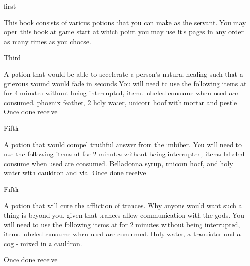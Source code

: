 \documentclass[greennotebook]{guildcamp3} %
\begin{document}
\startnotebook{\nServantPotions{}}

\begin{page}{first}
	
	This book consists of various potions that you can make as the servant. You may open this book at game start at which point you may use it's pages in any order as many times as you choose. 
	
\end{page}

\begin{page}{Third}
	
	A potion that would be able to accelerate a person's natural healing such that a grievous wound would fade in seconds
	You will need to use the following items at \sMageWorkbench{} for 4 minutes without being interrupted, items labeled consume when used are consumed.
	phoenix feather, 2 holy water, unicorn hoof with mortar and pestle
	Once done receive \iHealthRemedy{}
	
\end{page}

\begin{page}{Fifth}
	
	A potion that would compel truthful answer from the imbiber.
	You will need to use the following items at \sMageWorkbench{} for 2 minutes without being interrupted, items labeled consume when used are consumed.
	Belladonna syrup, unicorn hoof, and holy water with cauldron and vial
	Once done receive \iTruthPotion{}
	
\end{page}

\begin{page}{Fifth}
	
	A potion that will cure the affliction of trances. Why anyone would want such a thing is beyond you, given that trances allow communication with the gods. 
	You will need to use the following items at \sMageWorkbench{} for 2 minutes without being interrupted, items labeled consume when used are consumed.
	Holy water, a transistor and a cog - mixed in a cauldron. 
	
	Once done receive \iTranceCure{}
	
\end{page}

\endnotebook
\end{document}
